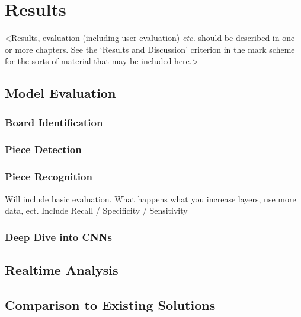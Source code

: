 \chapter{Results}
\label{chapter3}

<Results, evaluation (including user evaluation) {\em etc.} should be described in one or more chapters. See the `Results and Discussion' criterion in the mark scheme for the sorts of material that may be included here.>

\section{Model Evaluation}

\subsection{Board Identification}
\subsection{Piece Detection}
\subsection{Piece Recognition}
Will include basic evaluation.  What happens what you increase layers, use more data, ect.
Include Recall / Specificity / Sensitivity

\subsection{Deep Dive into CNNs}
\lipsum[6]

\section{Realtime Analysis}

\section{Comparison to Existing Solutions}
\lipsum[12]
